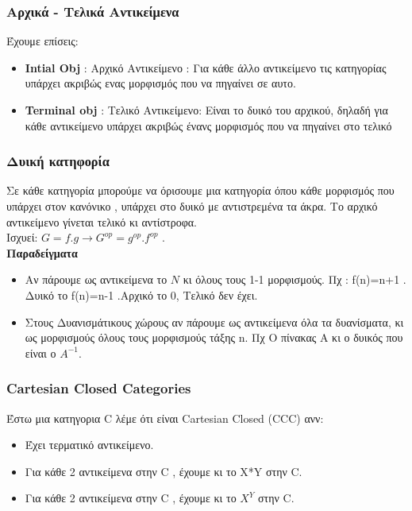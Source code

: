 \documentclass[hyperref={pdfpagelabels=false}]{beamer}
\begin{document}
\begin{frame}
	\frametitle{Αρχικά - Τελικά Αντικείμενα}
Έχουμε επίσεις:
\begin{itemize}
\item
{
	\textbf {Intial Obj} : Αρχικό Αντικείμενο : Για κάθε άλλο αντικείμενο τις κατηγορίας υπάρχει ακριβώς ενας μορφισμός που να πηγαίνει σε αυτο.
\pause
}
\item{
		\textbf{Terminal obj} : Τελικό Αντικείμενο: Είναι το δυικό του αρχικού, δηλαδή 	για κάθε αντικείμενο υπάρχει ακριβώς ένανς μορφισμός που να πηγαίνει στο τελικό
}
\end{itemize}
\end{frame}

\begin{frame}
	\frametitle{Δυική κατηφορία}
Σε κάθε κατηγορία μπορούμε να όρισουμε μια κατηγορία όπου κάθε μορφισμός που υπάρχει στον κανόνικο , υπάρχει στο δυικό με αντιστρεμένα τα άκρα.
Το αρχικό αντικείμενο γίνεται τελικό κι αντίστροφα.
\\
Ισχυεί: $G=f.g \rightarrow G^{op}=g^{op}.f^{op}$ .
\\
\textbf {Παραδείγματα}
\begin{itemize}
\item
{
Αν πάρουμε ως αντικείμενα το $N$ κι όλους τους 1-1 μορφισμούς. Πχ : f(n)=n+1 . Δυικό το f(n)=n-1 .Αρχικό το 0, Τελικό δεν έχει.
\pause
}
\item<2->
{
Στους Δυανισμάτικους χώρους αν πάρουμε ως αντικείμενα όλα τα δυανίσματα, κι ως μορφισμούς όλους τους μορφισμούς τάξης n. Πχ Ο πίνακας Α κι ο δυικός που είναι ο $A^{-1}$.

}
\end{itemize}
\end{frame}
\begin{frame}
	\frametitle{Cartesian Closed Categories}
Έστω μια κατηγορια C λέμε ότι είναι Cartesian Closed (CCC) ανν:
\begin{itemize}
\item
{
Έχει τερματικό αντικείμενο.
\pause
}
\item <2->
{
Για κάθε 2 αντικείμενα στην C , έχουμε κι το X*Y στην C. 
}
\item <3->
{
Για κάθε 2 αντικείμενα στην C , έχουμε κι το $X^Y$ στην C. 
}
\end{itemize}

\end{frame}
\end{document}
